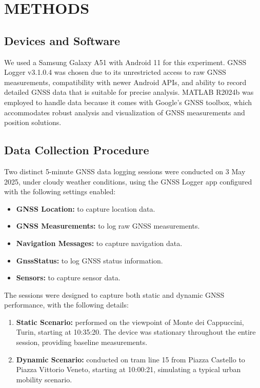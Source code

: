 
\section{METHODS} \label{sec:methods}

    \subsection{Devices and Software}
    
        We used a Samsung Galaxy A51 with Android 11 for this experiment.
        GNSS Logger v3.1.0.4 was chosen due to its unrestricted access to raw GNSS measurements, compatibility with newer Android APIs, and ability to record detailed GNSS data that is suitable for precise analysis.
        MATLAB R2024b was employed to handle data because it comes with Google's GNSS toolbox, which accommodates robust analysis and visualization of GNSS measurements and position solutions.
        
    \subsection{Data Collection Procedure}
    
        Two distinct 5-minute GNSS data logging sessions were conducted on 3 May 2025, under cloudy weather conditions, using the GNSS Logger app configured with the following settings enabled:

        \begin{itemize}
            \item \textbf{GNSS Location:} to capture location data.
            \item \textbf{GNSS Measurements:} to log raw GNSS measurements.
            \item \textbf{Navigation Messages:} to capture navigation data.
            \item \textbf{GnssStatus:} to log GNSS status information.
            \item \textbf{Sensors:} to capture sensor data.
        \end{itemize}
        
        \noindent The sessions were designed to capture both static and dynamic GNSS performance, with the following details:

        \begin{enumerate}[label=\alph*)]
            \item \textbf{Static Scenario:} performed on the viewpoint of Monte dei Cappuccini, Turin, starting at 10:35:20. The device was stationary throughout the entire session, providing baseline measurements.
            \item \textbf{Dynamic Scenario:} conducted on tram line 15 from Piazza Castello to Piazza Vittorio Veneto, starting at 10:00:21, simulating a typical urban mobility scenario.
        \end{enumerate}

